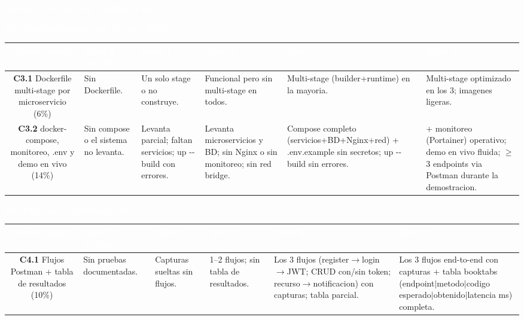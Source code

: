 \documentclass[10pt]{article}
\newcommand{\cab}[1]{\textcolor{white}{\textbf{#1}}}
\newcommand{\titulobanner}[1]{%
\begin{tcolorbox}[colback=azulOscuro,colframe=azulOscuro,boxrule=0pt,arc=2pt,left=8pt,right=8pt,top=5pt,bottom=5pt]
\textcolor{white}{\large\textbf{#1}}
\end{tcolorbox}}
\newcommand{\dimtitulo}[1]{%
\vspace{4pt}\begin{tcolorbox}[colback=azulMedio,colframe=azulMedio,boxrule=0pt,arc=1pt,left=6pt,right=6pt,top=3pt,bottom=3pt]
\textcolor{white}{\textbf{#1}}\end{tcolorbox}\vspace{-2pt}}
\begin{document}
\clearpage
\titulobanner{Matriz de evaluacion (continuacion)}
\vspace{3pt}
\dimtitulo{D3. Contenerizacion con Docker (20\%)}
\noindent\begin{tabularx}{\textwidth}{C *{5}{Y}}
\toprule
{} \cab{Criterio (peso)} & \cab{Nivel 0 -- Ausente} & \cab{Nivel 1} & \cab{Nivel 2} & \cab{Nivel 3} & \cab{Nivel 4} \\ \midrule
\textbf{C3.1} Dockerfile multi-stage por microservicio (6\%) & Sin Dockerfile. & Un solo stage o no construye. & Funcional pero sin multi-stage en todos. & Multi-stage (builder+runtime) en la mayoria. & Multi-stage optimizado en los 3; imagenes ligeras. \\
\textbf{C3.2} docker-compose, monitoreo, .env y demo en vivo (14\%) & Sin compose o el sistema no levanta. & Levanta parcial; faltan servicios; up -{}-build con errores. & Levanta microservicios y BD; sin Nginx o sin monitoreo; sin red bridge. & Compose completo (servicios+BD+Nginx+red) + .env.example sin secretos; up -{}-build sin errores. & + monitoreo (Portainer) operativo; demo en vivo fluida; $\geq$3 endpoints via Postman durante la demostracion. \\
\bottomrule
\end{tabularx}

\dimtitulo{D4. Pruebas y resultados (10\%)}
\noindent\begin{tabularx}{\textwidth}{C *{5}{Y}}
\toprule
{} \cab{Criterio (peso)} & \cab{Nivel 0 -- Ausente} & \cab{Nivel 1} & \cab{Nivel 2} & \cab{Nivel 3} & \cab{Nivel 4} \\ \midrule
\textbf{C4.1} Flujos Postman + tabla de resultados (10\%) & Sin pruebas documentadas. & Capturas sueltas sin flujos. & 1--2 flujos; sin tabla de resultados. & Los 3 flujos (register$\to$login$\to$JWT; CRUD con/sin token; recurso$\to$notificacion) con capturas; tabla parcial. & Los 3 flujos end-to-end con capturas + tabla booktabs (endpoint$|$metodo$|$codigo esperado$|$obtenido$|$latencia ms) completa. \\
\bottomrule
\end{tabularx}
\end{document}
